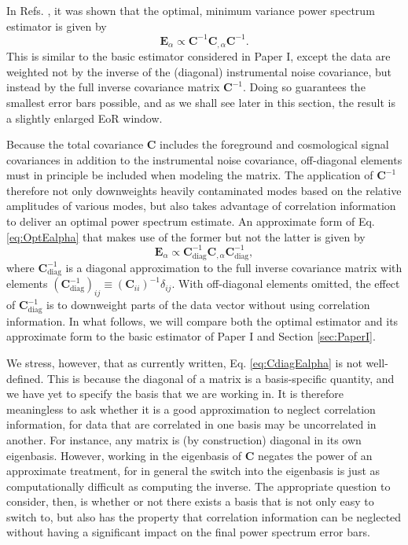 \documentclass[twocolumn,aps,prd,nofootinbib,showpacs]{revtex4-1}
\begin{document}
In Refs. \cite{Tegmark1997b,Bond1998}, it was shown that the optimal, minimum variance power spectrum estimator is given by
\begin{equation}
\label{eq:OptEalpha}
\mathbf{E}_\alpha \propto \mathbf{C}^{-1} \mathbf{C}_{,\alpha} \mathbf{C}^{-1}.
\end{equation}
This is similar to the basic estimator considered in Paper I, except the data are weighted not by the inverse of the (diagonal) instrumental noise covariance, but instead by the full inverse covariance matrix $\mathbf{C}^{-1}$.  Doing so guarantees the smallest error bars possible, and as we shall see later in this section, the result is a slightly enlarged EoR window.

Because the total covariance $\mathbf{C}$ includes the foreground and cosmological signal covariances in addition to the instrumental noise covariance, off-diagonal elements must in principle be included when modeling the matrix.  The application of $\mathbf{C}^{-1}$ therefore not only downweights heavily contaminated modes based on the relative amplitudes of various modes, but also takes advantage of correlation information to deliver an optimal power spectrum estimate.  An approximate form of Eq. \eqref{eq:OptEalpha} that makes use of the former but not the latter is given by
\begin{equation}
\label{eq:CdiagEalpha}
\mathbf{E}_\alpha \propto \mathbf{C}^{-1}_\textrm{diag} \mathbf{C}_{,\alpha} \mathbf{C}^{-1}_\textrm{diag},
\end{equation}
where $\mathbf{C}^{-1}_\textrm{diag}$ is a diagonal approximation to the full inverse covariance matrix with elements $(\mathbf{C}_\textrm{diag}^{-1})_{ij} \equiv (\mathbf{C}_{ii})^{-1} \delta_{ij}$.  With off-diagonal elements omitted, the effect of $\mathbf{C}^{-1}_\textrm{diag}$ is to downweight parts of the data vector without using correlation information.  In what follows, we will compare both the optimal estimator and its approximate form to the basic estimator of Paper I and Section \ref{sec:PaperI}.

We stress, however, that as currently written, Eq. \eqref{eq:CdiagEalpha} is not well-defined.  This is because the diagonal of a matrix is a basis-specific quantity, and we have yet to specify the basis that we are working in.  It is therefore meaningless to ask whether it is a good approximation to neglect correlation information, for data that are correlated in one basis may be uncorrelated in another.  For instance, any matrix is (by construction) diagonal in its own eigenbasis.  However, working in the eigenbasis of $\mathbf{C}$ negates the power of an approximate treatment, for in general the switch into the eigenbasis is just as computationally difficult as computing the inverse.  The appropriate question to consider, then, is whether or not there exists a basis that is not only easy to switch to, but also has the property that correlation information can be neglected without having a significant impact on the final power spectrum error bars.
\end{document}
